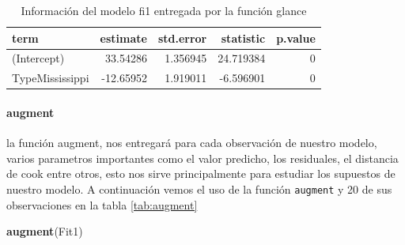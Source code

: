 \documentclass[]{book}
\newenvironment{Shaded}{\begin{snugshade}}{\end{snugshade}}
\newcommand{\KeywordTok}[1]{\textcolor[rgb]{0.13,0.29,0.53}{\textbf{#1}}}
\newcommand{\NormalTok}[1]{#1}
\let\oldparagraph\paragraph
\renewcommand{\paragraph}[1]{\oldparagraph{#1}\mbox{}}
\begin{document}
\begin{table}

\caption{\label{tab:tidy}Información del modelo fi1 entregada por la función glance}
\centering
\begin{tabular}[t]{lrrrr}
\toprule
term & estimate & std.error & statistic & p.value\\
\midrule
(Intercept) & 33.54286 & 1.356945 & 24.719384 & 0\\
TypeMississippi & -12.65952 & 1.919011 & -6.596901 & 0\\
\bottomrule
\end{tabular}
\end{table}

\hypertarget{augment}{%
\paragraph{augment}\label{augment}}

la función augment, nos entregará para cada observación de nuestro
modelo, varios parametros importantes como el valor predicho, los
residuales, el distancia de cook entre otros, esto nos sirve
principalmente para estudiar los supuestos de nuestro modelo. A
continuación vemos el uso de la función \texttt{augment} y 20 de sus
observaciones en la tabla \ref{tab:augment}

\begin{Shaded}
\begin{Highlighting}[]
\KeywordTok{augment}\NormalTok{(Fit1)}
\end{Highlighting}
\end{Shaded}
\end{document}
